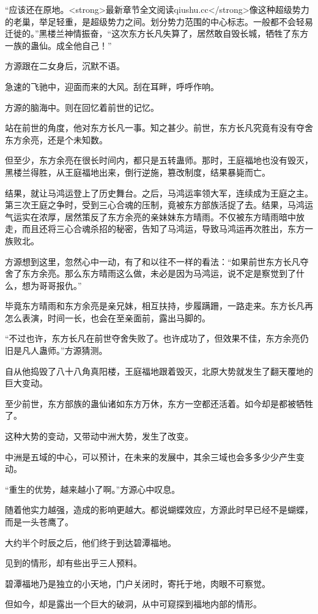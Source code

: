 \begin{this_body}
“应该还在原地。<strong>最新章节全文阅读qiushu.cc</strong>像这种超级势力的老巢，举足轻重，是超级势力之间。划分势力范围的中心标志。一般都不会轻易迁徙的。”黑楼兰神情振奋，“这次东方长凡失算了，居然敢自毁长城，牺牲了东方一族的蛊仙。成全他自己！”

方源跟在二女身后，沉默不语。

急速的飞驰中，迎面而来的大风。刮在耳畔，呼呼作响。

方源的脑海中。则在回忆着前世的记忆。

站在前世的角度，他对东方长凡一事。知之甚少。前世，东方长凡究竟有没有夺舍东方余亮，还是个未知数。

但至少，东方余亮在很长时间内，都只是五转蛊师。那时，王庭福地也没有毁灭，黑楼兰得胜，从王庭福地出来，倒行逆施，篡改制度，结果暴毙而亡。

结果，就让马鸿运登上了历史舞台。之后，马鸿运率领大军，连续成为王庭之主。第三次王庭之争时，受到三心合魂的压制，竟被东方部族活捉了去。结果，马鸿运气运实在浓厚，居然策反了东方余亮的亲妹妹东方晴雨。不仅被东方晴雨暗中放走，而且还将三心合魂杀招的秘密，告知了马鸿运，导致马鸿运再次胜出，东方一族败北。

方源想到这里，忽然心中一动，有了和以往不一样的看法：“如果前世东方长凡夺舍了东方余亮。那么东方晴雨这么做，未必是因为马鸿运，说不定是察觉到了什么，想为哥哥报仇。”

毕竟东方晴雨和东方余亮是亲兄妹，相互扶持，步履蹒跚，一路走来。东方长凡再怎么表演，时间一长，也会在至亲面前，露出马脚的。

“不过也许，东方长凡在前世夺舍失败了。也许成功了，但效果不佳，东方余亮仍旧是凡人蛊师。”方源猜测。

自从他捣毁了八十八角真阳楼，王庭福地跟着毁灭，北原大势就发生了翻天覆地的巨大变动。

至少前世，东方部族的蛊仙诸如东方万休，东方一空都还活着。如今却是都被牺牲了。

这种大势的变动，又带动中洲大势，发生了改变。

中洲是五域的中心，可以预计，在未来的发展中，其余三域也会多多少少产生变动。

“重生的优势，越来越小了啊。”方源心中叹息。

随着他实力越强，造成的影响更越大。都说蝴蝶效应，方源此时早已经不是蝴蝶，而是一头苍鹰了。

大约半个时辰之后，他们终于到达碧潭福地。

见到的情形，却有些出乎三人预料。

碧潭福地乃是独立的小天地，门户关闭时，寄托于地，肉眼不可察觉。

但如今，却是露出一个巨大的破洞，从中可窥探到福地内部的情形。


\end{this_body}
